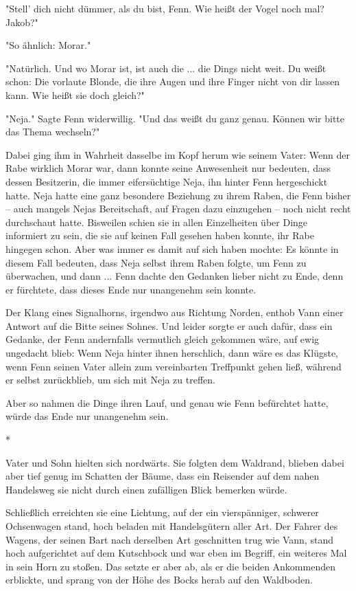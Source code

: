 \documentclass[10pt, a4paper, oneside]{book}
\begin{document}
\begin{multicols}{2}
"Stell' dich nicht dümmer, als du bist, Fenn. Wie heißt der Vogel noch mal? Jakob?"

"So ähnlich: Morar."

"Natürlich. Und wo Morar ist, ist auch die ... die Dings nicht weit. Du weißt schon: Die vorlaute Blonde, die ihre Augen und ihre Finger nicht von dir lassen kann. Wie heißt sie doch gleich?"

"Neja." Sagte Fenn widerwillig. "Und das weißt du ganz genau. Können wir bitte das Thema wechseln?"

Dabei ging ihm in Wahrheit dasselbe im Kopf herum wie seinem Vater: Wenn der Rabe wirklich Morar war, dann konnte seine Anwesenheit nur bedeuten, dass dessen Besitzerin, die immer eifersüchtige Neja, ihn hinter Fenn hergeschickt hatte. Neja hatte eine ganz besondere Beziehung zu ihrem Raben, die Fenn bisher – auch mangels Nejas Bereitschaft, auf Fragen dazu einzugehen – noch nicht recht durchschaut hatte. Bisweilen schien sie in allen Einzelheiten über Dinge informiert zu sein, die sie auf keinen Fall gesehen haben konnte, ihr Rabe hingegen schon. Aber was immer es damit auf sich haben mochte: Es könnte in diesem Fall bedeuten, dass Neja selbst ihrem Raben folgte, um Fenn zu überwachen, und dann ... Fenn dachte den Gedanken lieber nicht zu Ende, denn er fürchtete, dass dieses Ende nur unangenehm sein konnte.

Der Klang eines Signalhorns, irgendwo aus Richtung Norden, enthob Vann einer Antwort auf die Bitte seines Sohnes. Und leider sorgte er auch dafür, dass ein Gedanke, der Fenn andernfalls vermutlich gleich gekommen wäre, auf ewig ungedacht blieb: Wenn Neja hinter ihnen herschlich, dann wäre es das Klügste, wenn Fenn seinen Vater allein zum vereinbarten Treffpunkt gehen ließ, während er selbst zurückblieb, um sich mit Neja zu treffen.

Aber so nahmen die Dinge ihren Lauf, und genau wie Fenn befürchtet hatte, würde das Ende nur unangenehm sein.

\begin{center}
    *
\end{center}

Vater und Sohn hielten sich nordwärts. Sie folgten dem Waldrand, blieben dabei aber tief genug im Schatten der Bäume, dass ein Reisender auf dem nahen Handelsweg sie nicht durch einen zufälligen Blick bemerken würde.

Schließlich erreichten sie eine Lichtung, auf der ein vierspänniger, schwerer Ochsenwagen stand, hoch beladen mit Handelsgütern aller Art. Der Fahrer des Wagens, der seinen Bart nach derselben Art geschnitten trug wie Vann, stand hoch aufgerichtet auf dem Kutschbock und war eben im Begriff, ein weiteres Mal in sein Horn zu stoßen. Das setzte er aber ab, als er die beiden Ankommenden erblickte, und sprang von der Höhe des Bocks herab auf den Waldboden.


\end{multicols}
\end{document}
